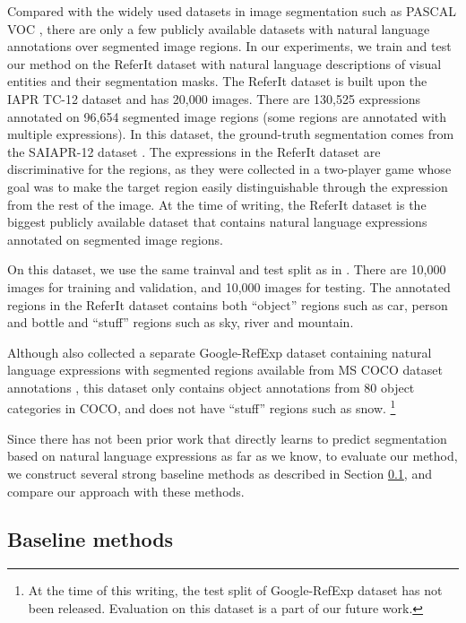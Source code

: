 \documentclass[runningheads]{llncs}
\begin{document}
Compared with the widely used datasets in image segmentation such as PASCAL VOC \cite{pascal-voc-2012}, there are only a few publicly available datasets with natural language annotations over segmented image regions. In our experiments, we train and test our method on the ReferIt dataset \cite{kazemzadeh2014referitgame} with natural language descriptions of visual entities and their segmentation masks. The ReferIt dataset \cite{kazemzadeh2014referitgame} is built upon the IAPR TC-12 dataset \cite{grubinger2006iapr} and has 20,000 images. There are 130,525 expressions annotated on 96,654 segmented image regions (some regions are annotated with multiple expressions). In this dataset, the ground-truth segmentation comes from the SAIAPR-12 dataset \cite{escalante2010segmented}. The expressions in the ReferIt dataset are discriminative for the regions, as they were collected in a two-player game whose goal was to make the target region easily distinguishable through the expression from the rest of the image. At the time of writing, the ReferIt dataset \cite{kazemzadeh2014referitgame} is the biggest publicly available dataset that contains natural language expressions annotated on segmented image regions.

On this dataset, we use the same trainval and test split as in \cite{hu2015natural,rohrbach2015grounding}. There are 10,000 images for training and validation, and 10,000 images for testing. The annotated regions in the ReferIt dataset contains both ``object'' regions such as car, person and bottle and ``stuff'' regions such as sky, river and mountain.

Although \cite{mao2015generation} also collected a separate Google-RefExp dataset containing natural language expressions with segmented regions available from MS COCO dataset annotations \cite{lin2014microsoft}, this dataset only contains object annotations from 80 object categories in COCO, and does not have ``stuff'' regions such as snow. \footnote{At the time of this writing, the test split of Google-RefExp dataset has not been released. Evaluation on this dataset is a part of our future work.}

Since there has not been prior work that directly learns to predict segmentation based on natural language expressions as far as we know, to evaluate our method, we construct several strong baseline methods as described in Section \ref{sec:baselines}, and compare our approach with these methods.

\subsection{Baseline methods}\label{sec:baselines}
\end{document}
